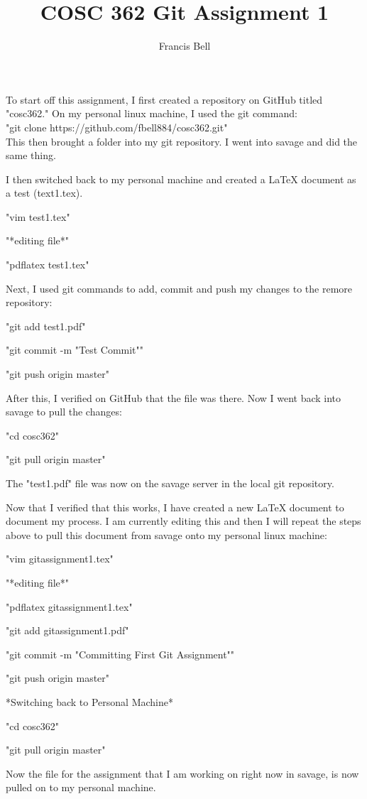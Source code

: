 \documentclass[12pt]{article}
\author{Francis Bell}
\title{COSC 362 Git Assignment 1}
\begin{document}
\maketitle

To start off this assignment, I first created a repository on GitHub titled "cosc362." On my personal linux machine, I used the git command:\\

		"git clone https://github.com/fbell884/cosc362.git"\\

This then brought a folder into my git repository. I went into savage and did the same thing.

I then switched back to my personal machine and created a LaTeX document as a test (text1.tex). 
	
	"vim test1.tex"

	"*editing file*"

	"pdflatex test1.tex"

Next, I used git commands to add, commit and push my changes to the remore repository:

	"git add test1.pdf"
	
	"git commit -m "Test Commit"" 

	"git push origin master"

After this, I verified on GitHub that the file was there. Now I went back into savage to pull the changes: 

	"cd cosc362"

	"git pull origin master"

The "test1.pdf" file was now on the savage server in the local git repository. 

Now that I verified that this works, I have created a new LaTeX document to document my process. I am currently editing this and then I will repeat the steps above to pull this document from savage onto my personal linux machine:

	"vim gitassignment1.tex"
	
	"*editing file*"

	"pdflatex gitassignment1.tex"

	"git add gitassignment1.pdf"

	"git commit -m "Committing First Git Assignment""

	"git push origin master"

*Switching back to Personal Machine*

	"cd cosc362"

	 "git pull origin master"

Now the file for the assignment that I am working on right now in savage, is now pulled on to my personal machine.
\end{document}
